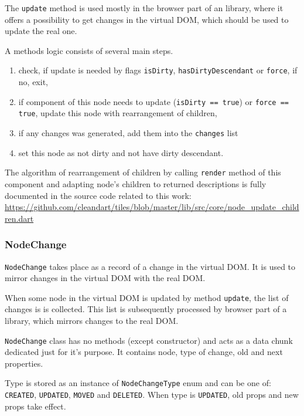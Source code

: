 \documentclass[oneside, 12pt]{book}
\begin{document}
      The \texttt{update} method is used mostly in the browser part of an library, where it offers a possibility to get changes in the virtual DOM, which should be used to update the real one. 

      A methods logic consists of several main steps.
      \begin{enumerate}
        \item check, if update is needed by flags \texttt{isDirty}, \texttt{hasDirtyDescendant} or \texttt{force}, if no, exit,
        \item if component of this node needs to update (\texttt{isDirty == true}) or \texttt{force == true}, update this node with rearrangement of children,
        \item if any changes was generated, add them into the \texttt{changes} list
        \item set this node as not dirty and not have dirty descendant.
      \end{enumerate}

      The algorithm of rearrangement of children by calling \texttt{render} method of this component 
      and adapting node's children to returned descriptions is fully documented in the source code related to this work: 
      \url{https://github.com/cleandart/tiles/blob/master/lib/src/core/node_update_children.dart}

    \subsubsection{NodeChange}\label{subsubsec:our-architecture-core-node-change}
      \texttt{NodeChange} takes place as a record of a change in the virtual DOM. 
      It is used to mirror changes in the virtual DOM with the real DOM. 

      When some node in the virtual DOM is updated by method \texttt{update}, the list of changes is is collected.
      This list is subsequently processed by browser part of a library, which mirrors changes to the real DOM.

      \texttt{NodeChange} class has no methods (except constructor) and acts as a data chunk dedicated just for it's purpose. 
      It contains node, type of change, old and next properties. 

      Type is stored as an instance of \texttt{NodeChangeType} enum and can be one of: \texttt{CREATED}, \texttt{UPDATED}, 
      \texttt{MOVED} and \texttt{DELETED}. 
      When type is \texttt{UPDATED}, old props and new props take effect. 
\end{document}
